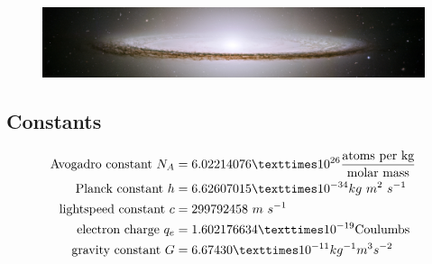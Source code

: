 \begin{figure}[h]
  \centering
  \includegraphics[width=\textwidth]{UWsombrero.jpg}
\end{figure}
\begin{multicols}{2}

\section{Constants} %
\begin{align*}
\text{Avogadro constant } N_A&=6.02214076×10^{26} {\text{atoms per kg} \over \text{molar mass}}\\
\text{Planck constant } h&= 6.62607015 × 10^{-34} kg~m^2~ s^{-1}\\
\text{lightspeed constant } c&=299792458 ~m~s^{-1}\\
\text{electron charge }q_e&=1.602176634 × 10^{-19} \text{Coulumbs}\\
\text{gravity constant }G&=6.674 30 × 10^{-11}kg^{-1} m^3 s^{-2}
\end{align*}

\end{multicols}
